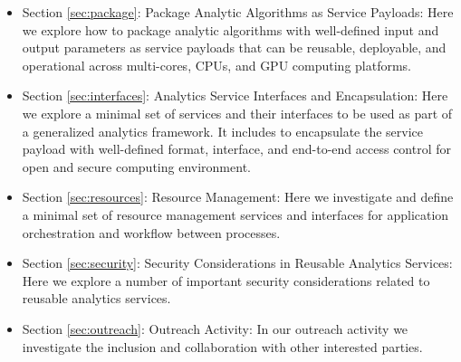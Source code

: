 \begin{itemize}
\item Section \ref{sec:package}: Package Analytic Algorithms as
  Service Payloads: Here we explore how to package analytic algorithms
  with well-defined input and output parameters as service payloads
  that can be reusable, deployable, and operational across
  multi-cores, CPUs, and GPU computing platforms.

\item Section \ref{sec:interfaces}: Analytics Service Interfaces and
  Encapsulation: Here we explore a minimal set of services and their
  interfaces to be used as part of a generalized analytics
  framework. It includes to encapsulate the service payload with
  well-defined format, interface, and end-to-end access control for
  open and secure computing environment.
  
\item Section \ref{sec:resources}: Resource Management: Here we
  investigate and define a minimal set of resource management services
  and interfaces for application orchestration and workflow between
  processes.

\item Section \ref{sec:security}: Security Considerations in Reusable
  Analytics Services: Here we explore a number of important security
  considerations related to reusable analytics services.  

\item Section \ref{sec:outreach}: Outreach Activity: In our outreach
  activity we investigate the inclusion and collaboration with other
  interested parties.

\end{itemize}

